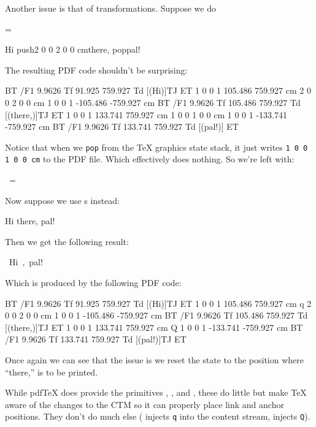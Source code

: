 Another issue is that of transformations.
Suppose we do

\blisting
\chardef\tgs=     %

Hi
\pdfcolorstack\tgs push{2 0 0 2 0 0 cm}there,
\pdfcolorstack\tgs pop{}pal!
\elisting

\noindent The resulting PDF code shouldn't be surprising:

\blisting {}
BT
/F1 9.9626 Tf 91.925 759.927 Td [(Hi)]TJ
ET
1 0 0 1 105.486 759.927 cm
2 0 0 2 0 0 cm              %
1 0 0 1 -105.486 -759.927 cm
BT
/F1 9.9626 Tf 105.486 759.927 Td [(there,)]TJ
ET
1 0 0 1 133.741 759.927 cm
1 0 0 1 0 0 cm              %
1 0 0 1 -133.741 -759.927 cm
BT
/F1 9.9626 Tf 133.741 759.927 Td [(pal!)]
ET
\elisting

\noindent Notice that when we {\tt pop} from the \TeX{} graphics state stack, it just writes
{\tt1 0 0 1 0 0 cm} to the PDF file.
Which effectively does nothing.
So we're left with:

\bigskip
\hbox{%
%
\chardef\tgs=
%
}

Now suppose we use \macro\pdfliteral s instead:

\blisting
Hi
there,
pal!
\elisting

\noindent Then we get the following result:

\bigskip
\hbox{%
Hi
,
pal!
}

\noindent Which is produced by the following PDF code:

\blisting {}
BT
/F1 9.9626 Tf 91.925 759.927 Td [(Hi)]TJ
ET
1 0 0 1 105.486 759.927 cm      %
q 2 0 0 2 0 0 cm        %
1 0 0 1 -105.486 -759.927 cm    %
BT
/F1 9.9626 Tf 105.486 759.927 Td [(there,)]TJ
ET
1 0 0 1 133.741 759.927 cm      %
Q                       %
1 0 0 1 -133.741 -759.927 cm    %
BT
/F1 9.9626 Tf 133.741 759.927 Td [(pal!)]TJ
ET
\elisting

\noindent Once again we can see that the issue is we reset the state to the position where ``there,'' is to
be printed.

While pdf\TeX{} does provide the primitives \macro\pdfsetmatrix, \macro\pdfsave, and \macro\pdfrestore, these
do little but make \TeX{} aware of the changes to the CTM so it can properly place link and anchor positions.
They don't do much else (\macro\pdfsave{} injects {\tt q} into the content stream, \macro\pdfrestore{} injects
{\tt Q}).

